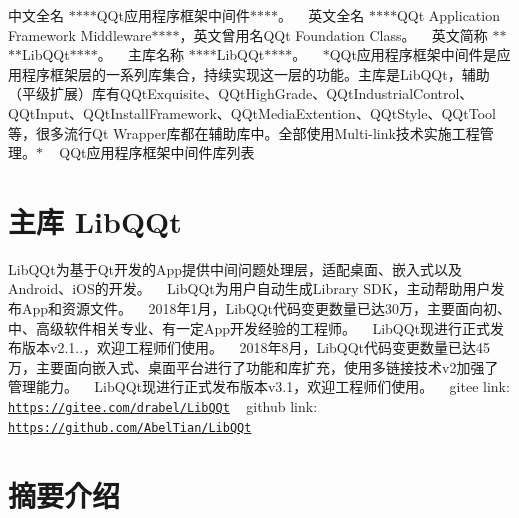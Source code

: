 中文全名 $\ast$$\ast$$\ast$$\ast$\+Q\+Qt应用程序框架中间件$\ast$$\ast$$\ast$$\ast$。 ~\newline
英文全名 $\ast$$\ast$$\ast$$\ast$\+Q\+Qt Application Framework Middleware$\ast$$\ast$$\ast$$\ast$，英文曾用名\+Q\+Qt Foundation Class。 ~\newline
英文简称 $\ast$$\ast$$\ast$$\ast$\+Lib\+Q\+Qt$\ast$$\ast$$\ast$$\ast$。 ~\newline
主库名称 $\ast$$\ast$$\ast$$\ast$\+Lib\+Q\+Qt$\ast$$\ast$$\ast$$\ast$。 ~\newline
$\ast$\+Q\+Qt应用程序框架中间件是应用程序框架层的一系列库集合，持续实现这一层的功能。主库是\+Lib\+Q\+Qt，辅助（平级扩展）库有\+Q\+Qt\+Exquisite、\+Q\+Qt\+High\+Grade、\+Q\+Qt\+Industrial\+Control、\+Q\+Qt\+Input、\+Q\+Qt\+Install\+Framework、\+Q\+Qt\+Media\+Extention、\+Q\+Qt\+Style、\+Q\+Qt\+Tool等，很多流行\+Qt Wrapper库都在辅助库中。全部使用\+Multi-\/link技术实施工程管理。$\ast$ ~\newline
Q\+Qt应用程序框架中间件库列表 ~\newline


\section*{主库 Lib\+Q\+Qt}

Lib\+Q\+Qt为基于\+Qt开发的\+App提供中间问题处理层，适配桌面、嵌入式以及\+Android、i\+O\+S的开发。 ~\newline
Lib\+Q\+Qt为用户自动生成\+Library S\+D\+K，主动帮助用户发布\+App和资源文件。 ~\newline
2018年1月，\+Lib\+Q\+Qt代码变更数量已达30万，主要面向初、中、高级软件相关专业、有一定\+App开发经验的工程师。 ~\newline
Lib\+Q\+Qt现进行正式发布版本v2.1..，欢迎工程师们使用。 ~\newline
2018年8月，\+Lib\+Q\+Qt代码变更数量已达45万，主要面向嵌入式、桌面平台进行了功能和库扩充，使用多链接技术v2加强了管理能力。 ~\newline
Lib\+Q\+Qt现进行正式发布版本v3.1，欢迎工程师们使用。 ~\newline
 gitee link\+: \href{https://gitee.com/drabel/LibQQt}{\tt https\+://gitee.\+com/drabel/\+Lib\+Q\+Qt} ~\newline
github link\+: \href{https://github.com/AbelTian/LibQQt}{\tt https\+://github.\+com/\+Abel\+Tian/\+Lib\+Q\+Qt} ~\newline
 

 \section*{摘要介绍}


